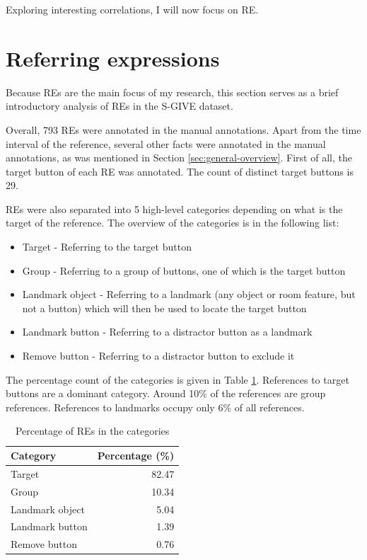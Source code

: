 Exploring interesting correlations, I will now focus on RE.

\section{Referring expressions}
Because REs are the main focus of my research, this section serves as a brief introductory analysis of REs in the S-GIVE dataset.

Overall, 793 REs were annotated in the manual annotations. Apart from the time interval of the reference, several other facts were annotated in the manual annotations, as was mentioned in Section \ref{sec:general-overview}. First of all, the target button of each RE was annotated. The count of distinct target buttons is 29.  

REs were also separated into 5 high-level categories depending on what is the target of the reference. The  overview of the categories is in the following list:

\begin{itemize}
\item
Target - Referring to the target button
\item
Group - Referring to a group of buttons, one of which is the target button
\item
Landmark object - Referring to a landmark (any object or room feature, but not a button) which will then be used to locate the target button
\item
Landmark button - Referring to a distractor button as a landmark
\item
Remove button -  Referring to a distractor button to exclude it
\end{itemize}

The percentage count of the categories is given in Table \ref{tab:res-groups}. References to target buttons are a dominant category. Around 10\% of the references are group references. References to landmarks occupy only 6\% of all references.

\begin{table}[!htbp]
 \centering
\begin{tabular}{lr}
\toprule
Category  & Percentage (\%)  \\
\midrule
Target   		& 82.47\\
Group 			& 10.34\\
Landmark object 	& 5.04\\
Landmark button	& 1.39\\
Remove button 	& 0.76\\
\bottomrule
\end{tabular}
\caption{Percentage of REs in the categories}
\label{tab:res-groups}
\end{table} 

